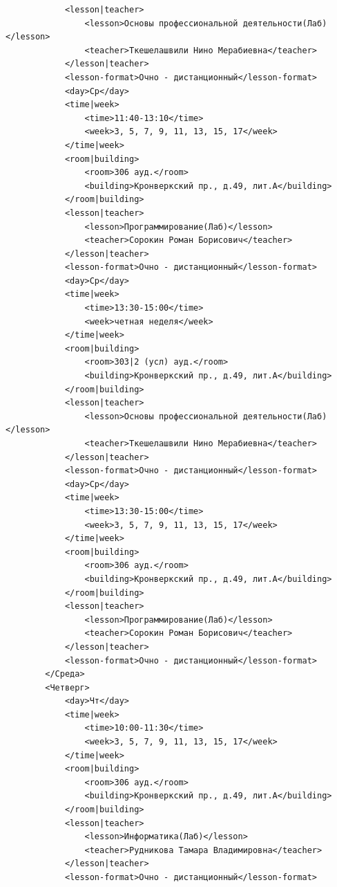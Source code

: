 \documentclass[12pt,onecolumn]{article}
\begin{document}
\begin{flushleft}
\begin{verbatim}
            <lesson|teacher>
                <lesson>Основы профессиональной деятельности(Лаб)</lesson>
                <teacher>Ткешелашвили Нино Мерабиевна</teacher>
            </lesson|teacher>
            <lesson-format>Очно - дистанционный</lesson-format>
            <day>Ср</day>
            <time|week>
                <time>11:40-13:10</time>
                <week>3, 5, 7, 9, 11, 13, 15, 17</week>
            </time|week>
            <room|building>
                <room>306 ауд.</room>
                <building>Кронверкский пр., д.49, лит.А</building>
            </room|building>
            <lesson|teacher>
                <lesson>Программирование(Лаб)</lesson>
                <teacher>Сорокин Роман Борисович</teacher>
            </lesson|teacher>
            <lesson-format>Очно - дистанционный</lesson-format>
            <day>Ср</day>
            <time|week>
                <time>13:30-15:00</time>
                <week>четная неделя</week>
            </time|week>
            <room|building>
                <room>303|2 (усл) ауд.</room>
                <building>Кронверкский пр., д.49, лит.А</building>
            </room|building>
            <lesson|teacher>
                <lesson>Основы профессиональной деятельности(Лаб)</lesson>
                <teacher>Ткешелашвили Нино Мерабиевна</teacher>
            </lesson|teacher>
            <lesson-format>Очно - дистанционный</lesson-format>
            <day>Ср</day>
            <time|week>
                <time>13:30-15:00</time>
                <week>3, 5, 7, 9, 11, 13, 15, 17</week>
            </time|week>
            <room|building>
                <room>306 ауд.</room>
                <building>Кронверкский пр., д.49, лит.А</building>
            </room|building>
            <lesson|teacher>
                <lesson>Программирование(Лаб)</lesson>
                <teacher>Сорокин Роман Борисович</teacher>
            </lesson|teacher>
            <lesson-format>Очно - дистанционный</lesson-format>
        </Среда>
        <Четверг>
            <day>Чт</day>
            <time|week>
                <time>10:00-11:30</time>
                <week>3, 5, 7, 9, 11, 13, 15, 17</week>
            </time|week>
            <room|building>
                <room>306 ауд.</room>
                <building>Кронверкский пр., д.49, лит.А</building>
            </room|building>
            <lesson|teacher>
                <lesson>Информатика(Лаб)</lesson>
                <teacher>Рудникова Тамара Владимировна</teacher>
            </lesson|teacher>
            <lesson-format>Очно - дистанционный</lesson-format>

\end{verbatim}
\end{flushleft}
\end{document}
